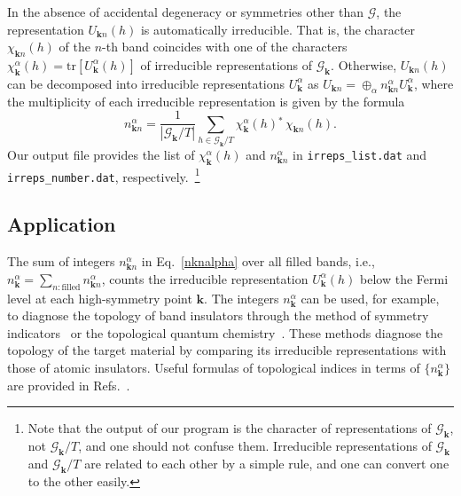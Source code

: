 \documentclass[3p,preprint]{elsarticle}
\newcommand{\calGk}{\mathcal{G}_{\bm{k}}}
\newcommand{\vk}{\bm{k}}
\begin{document}
In the absence of accidental degeneracy or symmetries other than $\mathcal{G}$, the representation $U_{\vk n}(h)$ is automatically irreducible. That is, the character $\chi_{\vk n}(h)$ of the $n$-th band coincides with one of the characters $\chi_{\vk}^\alpha(h)= \mathrm{tr}\left[U_{\vk}^\alpha(h) \right]$ of irreducible representations of $\calGk$.  Otherwise, $U_{\vk n}(h)$ can be decomposed into irreducible representations $U_{\vk}^\alpha$ as $U_{\vk n}=\oplus_\alpha n_{\vk n}^{\alpha}U_{\vk}^\alpha$, where the multiplicity of each irreducible representation is given by the formula
\begin{equation}
n_{\vk n}^{\alpha}=\frac{1}{|\calGk/T|}\sum_{h\in\calGk/T}\chi_{\vk}^\alpha(h){}^*\,\chi_{\vk n}(h).
\label{nknalpha}
\end{equation}
Our output file provides the list of $\chi_{\vk}^\alpha(h)$ and $n_{\vk n}^{\alpha}$ in \texttt{irreps\_list.dat} and \texttt{irreps\_number.dat}, respectively.~\footnote{Note that the output of our program is the character of representations of $\calGk$, not $\calGk/T$, and one should not confuse them. Irreducible representations of $\calGk$ and $\calGk/T$ are related to each other by a simple rule, and one can convert one to the other easily.}


\subsection{Application}
\label{subsec:SI}
The sum of integers $n_{\vk n}^{\alpha}$ in Eq.~\eqref{nknalpha} over all filled bands, i.e., $n_{\vk }^{\alpha}=\sum_{n:\text{filled}}n_{\vk n}^{\alpha}$, counts the irreducible representation $U_{\vk}^{\alpha}(h)$ below the Fermi level at each high-symmetry point $\vk$.  The integers $n_{\vk}^{\alpha}$  can be used, for example, to diagnose the topology of band insulators through the method of symmetry indicators~\cite{Po2017,SI_Adrian} or the topological quantum chemistry~\cite{TQC}. These methods diagnose the topology of the target material by comparing its irreducible representations with those of atomic insulators.
Useful formulas of topological indices in terms of $\{n_{\vk}^{\alpha}\}$ are provided in Refs.~\cite{PhysRevX.8.031069, PhysRevX.8.031070, QuantitativeMappings, Ono-Watanabe2018}.
\end{document}

